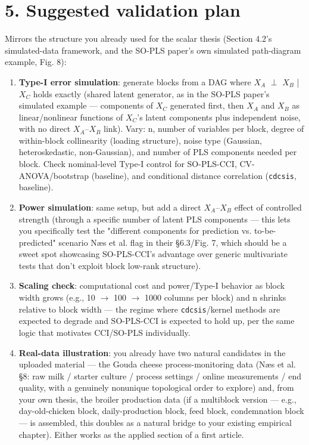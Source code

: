 \documentclass[11pt,a4paper]{article}
\begin{document}
	
	\section{5. Suggested validation plan}
	
	Mirrors the structure you already used for the scalar thesis (Section 4.2's simulated-data framework, and the SO-PLS paper's own simulated path-diagram example, Fig. 8):
	
	\begin{enumerate}
		\item \textbf{Type-I error simulation}: generate blocks from a DAG where \(X_A\) \(\perp\) \(X_B\) | \(X_C\) holds exactly (shared latent generator, as in the SO-PLS paper's simulated example — components of \(X_C\) generated first, then \(X_A\) and \(X_B\) as linear/nonlinear functions of \(X_C\)'s latent components plus independent noise, with no direct \(X_A\)–\(X_B\) link). Vary: n, number of variables per block, degree of within-block collinearity (loading structure), noise type (Gaussian, heteroskedastic, non-Gaussian), and number of PLS components needed per block. Check nominal-level Type-I control for SO-PLS-CCI, CV-ANOVA/bootstrap (baseline), and conditional distance correlation (\texttt{cdcsis}, baseline).
		\item \textbf{Power simulation}: same setup, but add a direct \(X_A\)–\(X_B\) effect of controlled strength (through a specific number of latent PLS components — this lets you specifically test the "different components for prediction vs. to-be-predicted" scenario Næs et al. flag in their \S{}6.3/Fig. 7, which should be a sweet spot showcasing SO-PLS-CCI's advantage over generic multivariate tests that don't exploit block low-rank structure).
		\item \textbf{Scaling check}: computational cost and power/Type-I behavior as block width grows (e.g., 10 \(\rightarrow\) 100 \(\rightarrow\) 1000 columns per block) and n shrinks relative to block width — the regime where \texttt{cdcsis}/kernel methods are expected to degrade and SO-PLS-CCI is expected to hold up, per the same logic that motivates CCI/SO-PLS individually.
		\item \textbf{Real-data illustration}: you already have two natural candidates in the uploaded material — the Gouda cheese process-monitoring data (Næs et al. \S{}8: raw milk / starter culture / process settings / online measurements / end quality, with a genuinely nonunique topological order to explore) and, from your own thesis, the broiler production data (if a multiblock version — e.g., day-old-chicken block, daily-production block, feed block, condemnation block — is assembled, this doubles as a natural bridge to your existing empirical chapter). Either works as the applied section of a first article.
		
	\end{enumerate}
	
\end{document}
